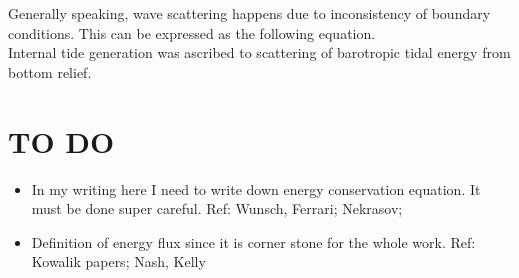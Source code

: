 Generally speaking, wave scattering happens due to inconsistency of boundary conditions. This can be expressed as the following equation.\\

Internal tide generation was ascribed to scattering of barotropic tidal energy from bottom relief.

\newpage
\section{TO DO}
\begin{itemize}
\item In my writing here I need to write down energy conservation equation. It must be done super careful. Ref: Wunsch, Ferrari; Nekrasov; 
\item Definition of energy flux since it is corner stone for the whole work. Ref: Kowalik papers; Nash, Kelly

\end{itemize}




